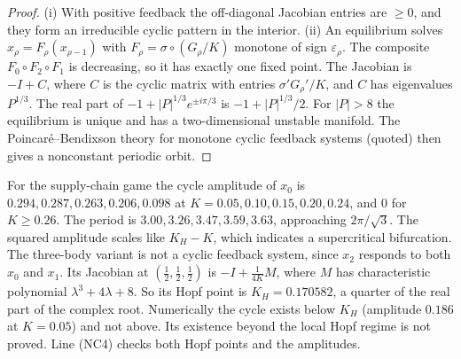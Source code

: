 \begin{proof}
(i) With positive feedback the off-diagonal Jacobian entries are $\ge0$, and they form an
irreducible cyclic pattern in the interior. (ii) An equilibrium solves $x_\rho=F_\rho(x_{\rho-1})$
with $F_\rho=\sigma\circ(G_\rho/K)$ monotone of sign $\varepsilon_\rho$. The composite
$F_0\circ F_2\circ F_1$ is decreasing, so it has exactly one fixed point. The Jacobian is $-I+C$,
where $C$ is the cyclic matrix with entries $\sigma'G_\rho'/K$, and $C$ has eigenvalues $P^{1/3}$.
The real part of $-1+|P|^{1/3}e^{\pm i\pi/3}$ is $-1+|P|^{1/3}/2$. For $|P|>8$ the equilibrium is
unique and has a two-dimensional unstable manifold. The Poincar\'e--Bendixson theory for monotone
cyclic feedback systems \cite{MPS90} (quoted) then gives a nonconstant periodic orbit.
\end{proof}

\begin{remark}\label{V3P5:rem:cyclenum}
For the supply-chain game the cycle amplitude of $x_0$ is $0.294,0.287,0.263,0.206,0.098$ at
$K=0.05,0.10,0.15,0.20,0.24$, and $0$ for $K\ge0.26$. The period is $3.00,3.26,3.47,3.59,3.63$,
approaching $2\pi/\sqrt3$. The squared amplitude scales like $K_H-K$, which indicates a
supercritical bifurcation. The three-body variant is not a cyclic feedback system, since $x_2$
responds to both $x_0$ and $x_1$. Its Jacobian at $(\frac12,\frac12,\frac12)$ is
$-I+\frac1{4K}M$, where $M$ has characteristic polynomial $\lambda^{3}+4\lambda+8$. So its Hopf point
is $K_H=0.170582$, a quarter of the real part of the complex root. Numerically the
cycle exists below $K_H$ (amplitude $0.186$ at $K=0.05$) and not above. Its existence beyond the
local Hopf regime is not proved. Line (NC4) checks both Hopf points and the amplitudes.
\end{remark}

